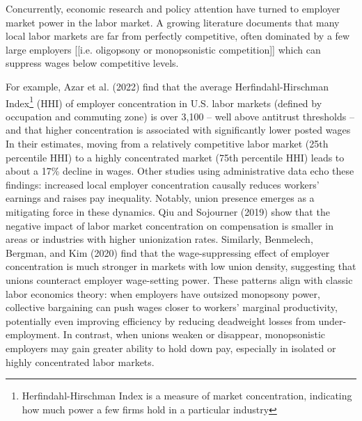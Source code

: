 Concurrently, economic research and policy attention have turned to employer market power in the labor market. A growing literature documents that many local labor markets are far from perfectly competitive, often dominated by a few large employers [[i.e. oligopsony or monopsonistic competition]] which can suppress wages below competitive levels.

For example, Azar et al. (2022) find that the average Herfindahl-Hirschman Index\footnote{Herfindahl-Hirschman Index is a measure of market concentration, indicating how much power a few firms hold in a particular industry} (HHI) of employer concentration in U.S. labor markets (defined by occupation and commuting zone) is over 3,100 – well above antitrust thresholds – and that higher concentration is associated with significantly lower posted wages
In their estimates, moving from a relatively competitive labor market (25th percentile HHI) to a highly concentrated market (75th percentile HHI) leads to about a 17\% decline in wages.
Other studies using administrative data echo these findings: increased local employer concentration causally reduces workers’ earnings and raises pay inequality.
Notably, union presence emerges as a mitigating force in these dynamics. 
Qiu and Sojourner (2019) show that the negative impact of labor market concentration on compensation is smaller in areas or industries with higher unionization rates.
Similarly, Benmelech, Bergman, and Kim (2020) find that the wage-suppressing effect of employer concentration is much stronger in markets with low union density, suggesting that unions counteract employer wage-setting power.
These patterns align with classic labor economics theory: when employers have outsized monopsony power, collective bargaining can push wages closer to workers’ marginal productivity, potentially even improving efficiency by reducing deadweight losses from under-employment.
In contrast, when unions weaken or disappear, monopsonistic employers may gain greater ability to hold down pay, especially in isolated or highly concentrated labor markets.

